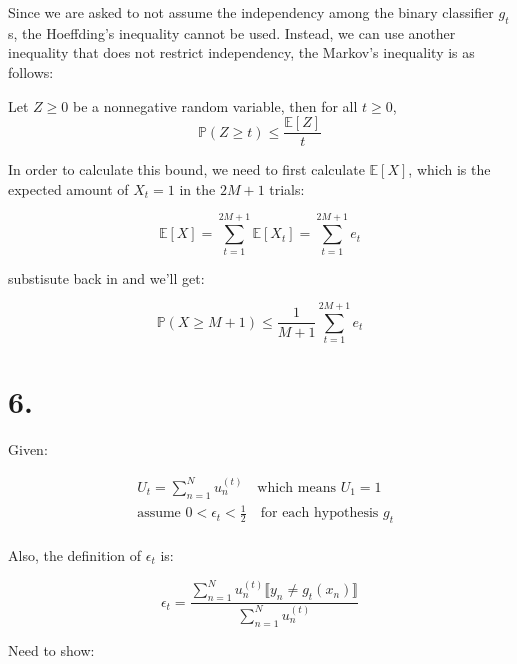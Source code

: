 \documentclass{article}
\begin{document}
Since we are asked to not assume the independency among the binary classifier $g_t$s,
the Hoeffding's inequality cannot be used. 
Instead, we can use another inequality that does not restrict independency, the Markov's inequality is as follows:

\begin{mdframed}
Let $Z \ge 0$ be a nonnegative random variable, then for all $t \ge 0$,
\begin{equation*}
    \mathbb{P}(Z \ge t) \le \frac{\mathbb{E}[Z]}{t}
\end{equation*}
\end{mdframed}

In order to calculate this bound, we need to first calculate $\mathbb{E}[X]$, 
which is the expected amount of $X_t = 1$ in the $2M + 1$ trials:

\begin{equation*}
    \mathbb{E}[X] = \sum_{t=1}^{2M+1} \mathbb{E}[X_t] = \sum_{t=1}^{2M+1} e_t
\end{equation*}

substisute back in and we'll get:

\begin{equation*}
\mathbb{P}(X \ge M + 1) \le \frac{1}{M + 1}\sum_{t=1}^{2M+1} e_t
\end{equation*}

\newpage

\section*{6.}

Given:

\begin{equation*}
\begin{split}
    &U_t = \sum_{n=1}^N u_n^{(t)} \quad \text{which means } U_1 = 1 \\
    &\text{assume } 0 < \epsilon_t < \frac{1}{2} \quad \text{for each hypothesis } g_t \\
\end{split}
\end{equation*}

Also, the definition of $\epsilon_t$ is:

\begin{equation*}
    \epsilon_t = \frac{\sum_{n=1}^N u_n^{(t)}\llbracket y_n \neq g_t(x_n) \rrbracket}{\sum_{n=1}^N u_n^{(t)}}
\end{equation*}

Need to show:
\end{document}
